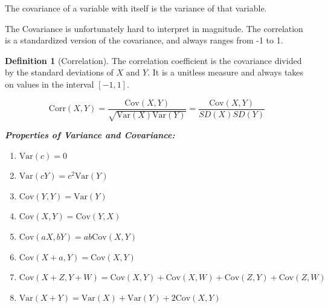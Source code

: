 \documentclass[
]{book}
\providecommand{\tightlist}{%
  \setlength{\itemsep}{0pt}\setlength{\parskip}{0pt}}
\theoremstyle{definition}
\newtheorem{definition}{Definition}[chapter]
\theoremstyle{definition}
\theoremstyle{definition}
\theoremstyle{remark}
\begin{document}
The covariance of a variable with itself is the variance of that variable.

The Covariance is unfortunately hard to interpret in magnitude. The correlation is a standardized version of the covariance, and always ranges from -1 to 1.

\begin{definition}[Correlation]
\protect\hypertarget{def:unnamed-chunk-86}{}{\label{def:unnamed-chunk-86} {} }The correlation coefficient is the covariance divided by the standard deviations of \(X\) and \(Y\). It is a unitless measure and always takes on values in the interval \([-1,1]\).

\[\text{Corr}(X, Y) = \frac{\text{Cov}(X,Y)}{\sqrt{\text{Var}(X)\text{Var}(Y)}} = \frac{\text{Cov}(X,Y)}{SD(X)SD(Y)}\]
\end{definition}

\textbf{\emph{Properties of Variance and Covariance:}}

\begin{enumerate}
\def\labelenumi{\arabic{enumi}.}
\tightlist
\item
  \(\text{Var}(c) = 0\)
\item
  \(\text{Var}(cY) = c^2 \text{Var}(Y)\)
\item
  \(\text{Cov}(Y,Y) = \text{Var}(Y)\)
\item
  \(\text{Cov}(X,Y) = \text{Cov}(Y,X)\)
\item
  \(\text{Cov}(aX,bY) = ab \text{Cov}(X,Y)\)
\item
  \(\text{Cov}(X+a,Y) = \text{Cov}(X,Y)\)
\item
  \(\text{Cov}(X+Z,Y+W) = \text{Cov}(X,Y) + \text{Cov}(X,W) + \text{Cov}(Z,Y) + \text{Cov}(Z,W)\)
\item
  \(\text{Var}(X+Y) = \text{Var}(X) + \text{Var}(Y) + 2\text{Cov}(X,Y)\)
\end{enumerate}
\end{document}
